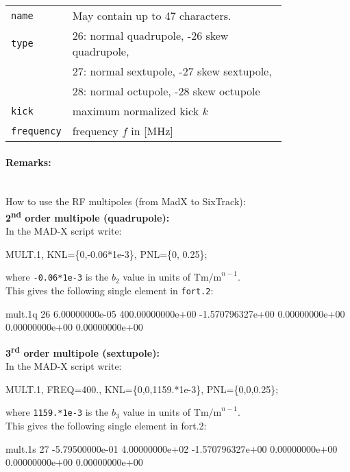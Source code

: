 \bigskip
\begin{tabular}{@{}lp{0.8\linewidth}}
    \texttt{name} & May contain up to 47 characters. \\
    \texttt{type} & 26: normal quadrupole, -26 skew quadrupole, \\
                  & 27: normal sextupole, -27 skew sextupole, \\
                  & 28: normal octupole, -28 skew octupole \\
    \texttt{kick} & maximum normalized kick $k$ \\
    \texttt{frequency} & frequency $f$ in [MHz]
\end{tabular}

\paragraph{Remarks:}~\\
How to use the RF multipoles (from MadX to SixTrack):\\

\noindent\textbf{2\textsuperscript{nd} order multipole (quadrupole):}\\
\noindent In the MAD-X script write:
\begin{cverbatim}
MULT.1, KNL=\{0,-0.06*1e-3\}, PNL=\{0, 0.25\};
\end{cverbatim}
where \texttt{-0.06*1e-3} is the $b_2$ value in units of $\mathrm{Tm/m}^{n-1}$.\\
This gives the following single element in \texttt{fort.2}:
\begin{cverbatim}
mult.1q  26  6.00000000e-05  400.00000000e+00  -1.570796327e+00  0.00000000e+00  0.00000000e+00  0.00000000e+00
\end{cverbatim}

\noindent\textbf{3\textsuperscript{rd} order multipole (sextupole):}\\
\noindent In the MAD-X script write:
\begin{cverbatim}
MULT.1, FREQ=400., KNL=\{0,0,1159.*1e-3\}, PNL=\{0,0,0.25\};
\end{cverbatim}
where \texttt{1159.*1e-3} is the $b_3$ value in units of $\mathrm{Tm/m}^{n-1}$.\\
This gives the following single element in fort.2:
\begin{cverbatim}
mult.1s  27 -5.79500000e-01  4.00000000e+02  -1.570796327e+00  0.00000000e+00  0.00000000e+00  0.00000000e+00
\end{cverbatim}

